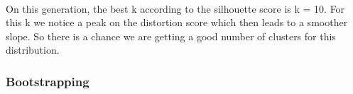 \documentclass[11pt]{article}
\begin{document}
    \begin{center}
    \end{center}
    { \hspace*{\fill} \\}
    
    On this generation, the best k according to the silhouette score is k =
10. For this k we notice a peak on the distortion score which then leads
to a smoother slope. So there is a chance we are getting a good number
of clusters for this distribution.

    \hypertarget{bootstrapping}{%
\subsubsection{Bootstrapping}\label{bootstrapping}}
\end{document}

